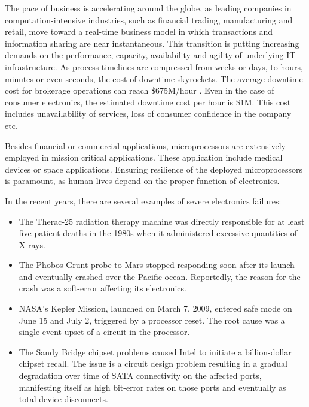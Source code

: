 \documentclass[12pt]{yalephd}
\begin{document}
The pace of business is accelerating around the globe, as leading companies in computation-intensive industries, such as financial trading, manufacturing and retail, move toward a real-time business model in which transactions and information sharing are near instantaneous. This transition is putting increasing demands on the performance, capacity, availability and agility of underlying IT infrastructure. As process timelines are compressed from weeks or days, to hours, minutes or even seconds, the cost of downtime skyrockets. The average downtime cost for brokerage operations can reach \$675M/hour \cite{hennessy2011computer}. Even in the case of consumer electronics, the estimated downtime cost per hour is \$1M. This cost includes unavailability of services, loss of consumer confidence in the company etc. 

Besides financial or commercial applications, microprocessors are extensively employed in mission critical applications. These application include medical devices or space applications. Ensuring resilience of the deployed microprocessors is paramount, as human lives depend on the proper function of electronics.

In the recent years, there are several examples of severe electronics failures:
\begin{itemize}
  \item The Therac-25 radiation therapy machine was directly responsible for at least five patient deaths in the 1980s when it administered excessive quantities of X-rays.%
  \item The Phobos-Grunt probe to Mars stopped responding soon after its launch and eventually crashed over the Pacific ocean. Reportedly, the reason for the crash was a soft-error affecting its electronics.
  \item NASA's Kepler Mission, launched on March 7, 2009, entered safe mode on June 15 and July 2, triggered by a processor reset. The root cause was a single event upset of a circuit in the processor.%
  \item The Sandy Bridge chipset problems caused Intel to initiate a billion-dollar chipset recall. The issue is a circuit design problem resulting in a gradual degradation over time of SATA connectivity on the affected ports, manifesting itself as high bit-error rates on those ports and eventually as total device disconnects.	  	
\end{itemize} 
\end{document}
